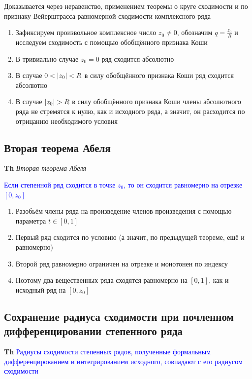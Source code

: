 Доказывается через неравенство, применением теоремы о круге сходимости и по признаку Вейерштрасса равномерной
сходимости комплексного ряда

\begin{enumerate}
    \item Зафиксируем произвольное комплексное число $z_0 \neq 0$, обозначим $q = \frac{z_0}{R}$ и исследуем
    сходимость с помощью обобщённого признака Коши
    \item В тривиально случае $z_0 = 0$ ряд сходится абсолютно
    \item В случае $0 < \abs{z_0} < R$ в силу обобщённого признака Коши ряд сходится абсолютно
    \item В случае $\abs{z_0} > R$ в силу обобщённого признака Коши члены абсолютного ряда не стремятся к нулю,
    как и исходного ряда, а значит, он расходится по отрицанию необходимого условия
\end{enumerate}

\subsection{Вторая теорема Абеля}

\textbf{Th} \textit{Вторая теорема Абеля}

\textcolor{blue}{Если степенной ряд сходится в точке $z_0$, то он сходится равномерно на отрезке $[0, z_0]$}

\begin{enumerate}
    \item Разобьём члены ряда на произведение членов произведения с помощью параметра $t \in [0, 1]$
    \item Первый ряд сходится по условию (а значит, по предыдущей теореме, ещё и равномерно)
    \item Второй ряд равномерно ограничен на отрезке и монотонен по индексу
    \item Поэтому два вещественных ряда сходятся равномерно на $[0, 1]$, как и исходный ряд на $[0, z_0]$
\end{enumerate}

\subsection{Сохранение радиуса сходимости при почленном дифференцировании степенного ряда}

\textbf{Th} \textcolor{blue}{Радиусы сходимости степенных рядов, полученные формальным дифференцированием и
интегрированием исходного, совпадают с его радиусом сходимости}

